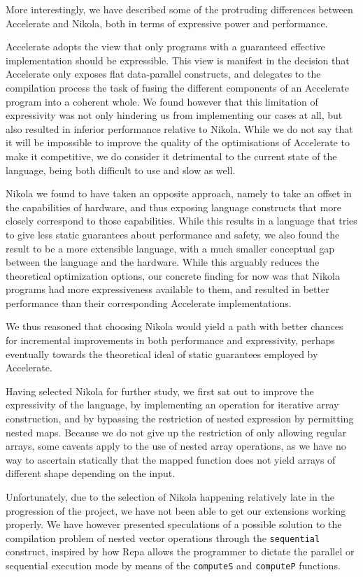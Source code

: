 More interestingly, we have described some of the protruding differences
between Accelerate and Nikola, both in terms of expressive power and
performance.

Accelerate adopts the view that only programs with a guaranteed effective
implementation should be expressible. This view is manifest in the decision
that Accelerate only exposes flat data-parallel constructs, and delegates to
the compilation process the task of fusing the different components of an
Accelerate program into a coherent whole.  We found however that this
limitation of expressivity was not only hindering us from implementing our
cases at all, but also resulted in inferior performance relative to Nikola.
While we do not say that it will be impossible to improve the quality of the
optimisations of Accelerate to make it competitive, we do consider it
detrimental to the current state of the language, being both difficult to use
and slow as well.

Nikola we found to have taken an opposite approach, namely to take an offset in
the capabilities of hardware, and thus exposing language constructs that more
closely correspond to those capabilities.  While this results in a language
that tries to give less static guarantees about performance and safety, we also
found the result to be a more extensible language, with a much smaller
conceptual gap between the language and the hardware. While this arguably
reduces the theoretical optimization options, our concrete finding for now was
that Nikola programs had more expressiveness available to them, and resulted in
better performance than their corresponding Accelerate implementations.

We thus reasoned that choosing Nikola would yield a path with better chances
for incremental improvements in both performance and expressivity, perhaps
eventually towards the theoretical ideal of static guarantees employed by
Accelerate.

Having selected Nikola for further study, we first sat out to improve
the expressivity of the language, by implementing an operation for
iterative array construction, and by bypassing the restriction of
nested expression by permitting nested maps. Because we do not give up
the restriction of only allowing regular arrays, some caveats apply to
the use of nested array operations, as we have no way to ascertain
statically that the mapped function does not yield arrays of different
shape depending on the input.

Unfortunately, due to the selection of Nikola happening relatively late in the
progression of the project, we have not been able to get our extensions working
properly. We have however presented speculations of a possible solution to the
compilation problem of nested vector operations through the
\lstinline{sequential} construct, inspired by how Repa allows the programmer to
dictate the parallel or sequential execution mode by means of the
\lstinline{computeS} and \lstinline{computeP} functions.

